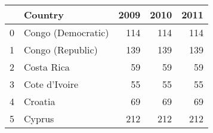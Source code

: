 \begin{tabular}{llrrr}
\toprule
 & Country & 2009 & 2010 & 2011 \\
\midrule
0 & Congo (Democratic) & 114 & 114 & 114 \\
1 & Congo (Republic) & 139 & 139 & 139 \\
2 & Costa Rica & 59 & 59 & 59 \\
3 & Cote d'Ivoire & 55 & 55 & 55 \\
4 & Croatia & 69 & 69 & 69 \\
5 & Cyprus & 212 & 212 & 212 \\
\bottomrule
\end{tabular}
